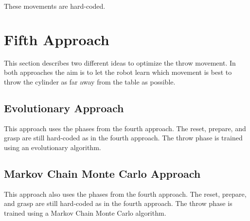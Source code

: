 \documentclass[10pt,twocolumn,letterpaper]{article}
\begin{document}
These movements are hard-coded.

\section{Fifth Approach} \label{sec:fifthApproach}

This section describes two different ideas to optimize the throw movement. In both approaches the aim is to let the robot learn which movement is best to throw the cylinder as far away from the table as possible.

\subsection{Evolutionary Approach} \label{subsec:EA}

This approach uses the phases from the fourth approach. The reset, prepare, and grasp are still hard-coded as in the fourth approach. The throw phase is trained using an evolutionary algorithm. 

\subsection{Markov Chain Monte Carlo Approach} \label{subsec:MCMC}

This approach also uses the phases from the fourth approach. The reset, prepare, and grasp are still hard-coded as in the fourth approach. The throw phase is trained using a Markov Chain Monte Carlo algorithm. 

{\small


}
\end{document}
